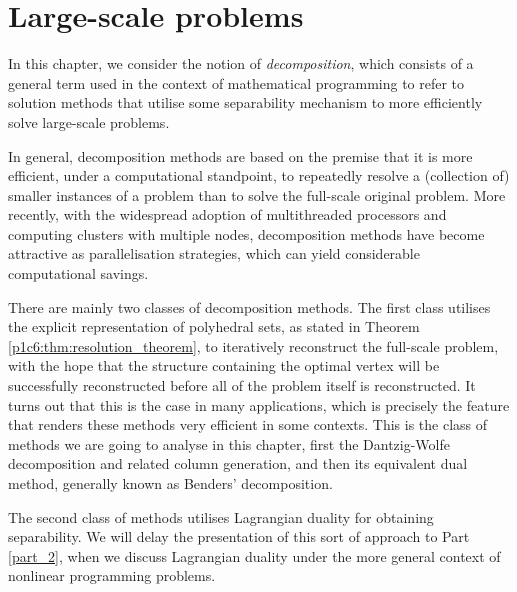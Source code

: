 \section{Large-scale problems} \label{section_71}

In this chapter, we consider the notion of \emph{decomposition}, which consists of a general term used in the context of mathematical programming to refer to solution methods that utilise some separability mechanism to more efficiently solve large-scale problems.

In general, decomposition methods are based on the premise that it is more efficient, under a computational standpoint, to repeatedly resolve a (collection of) smaller instances of a problem than to solve the full-scale original problem. More recently, with the widespread adoption of multithreaded processors and computing clusters with multiple nodes, decomposition methods have become attractive as parallelisation strategies, which can yield considerable computational savings. 

There are mainly two classes of decomposition methods. The first class utilises the explicit representation of polyhedral sets, as stated in Theorem \ref{p1c6:thm:resolution_theorem}, to iteratively reconstruct the full-scale problem, with the hope that the structure containing the optimal vertex will be successfully reconstructed before all of the problem itself is reconstructed. It turns out that this is the case in many applications, which is precisely the feature that renders these methods very efficient in some contexts. This is the class of methods we are going to analyse in this chapter, first the Dantzig-Wolfe decomposition and related column generation, and then its equivalent dual method, generally known as Benders' decomposition.


The second class of methods utilises Lagrangian duality for obtaining separability. We will delay the presentation of this sort of approach to Part \ref{part_2}, when we discuss Lagrangian duality under the more general context of nonlinear programming problems.

